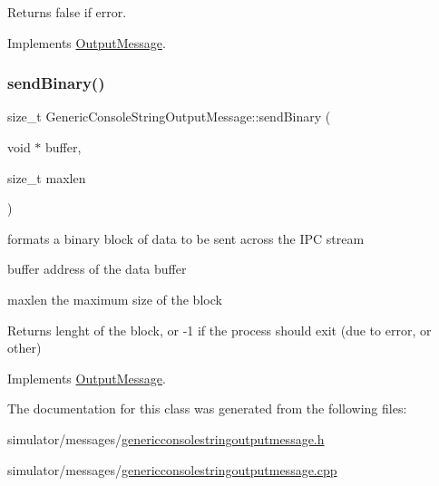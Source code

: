 \begin{DoxyReturn}{Returns}
false if error. 
\end{DoxyReturn}


Implements \mbox{\hyperlink{class_output_message_a6f817de4d3430dc98521431385b95328}{Output\+Message}}.

\mbox{\label{class_generic_console_string_output_message_abc038d7b5db3a2b2835ea23ad35d77e9}} 
\subsubsection{\texorpdfstring{sendBinary()}{sendBinary()}}
{\footnotesize\ttfamily size\+\_\+t Generic\+Console\+String\+Output\+Message\+::send\+Binary (\begin{DoxyParamCaption}\item[{void $\ast$}]{buffer,  }\item[{size\+\_\+t}]{maxlen }\end{DoxyParamCaption})\hspace{0.3cm}{\ttfamily [virtual]}}



formats a binary block of data to be sent across the I\+PC stream 

\begin{DoxyItemize}
\item buffer address of the data buffer \item maxlen the maximum size of the block \begin{DoxyReturn}{Returns}
lenght of the block, or -\/1 if the process should exit (due to error, or other) 
\end{DoxyReturn}
\end{DoxyItemize}


Implements \mbox{\hyperlink{class_output_message_a42e0a2560b1bf9e58b6626056f87b8c2}{Output\+Message}}.



The documentation for this class was generated from the following files\+:\begin{DoxyCompactItemize}
\item 
simulator/messages/\mbox{\hyperlink{genericconsolestringoutputmessage_8h}{genericconsolestringoutputmessage.\+h}}\item 
simulator/messages/\mbox{\hyperlink{genericconsolestringoutputmessage_8cpp}{genericconsolestringoutputmessage.\+cpp}}\end{DoxyCompactItemize}
